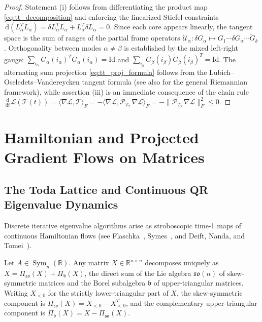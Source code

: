 \documentclass[11pt,a4paper,reqno]{amsart}
\theoremstyle{definition}
\numberwithin{equation}{section}
\providecommand{\R}{\mathbb{R}}
\newcommand{\Id}{\mathrm{Id}}
\newcommand{\dif}{\,\mathrm{d}}
\providecommand{\R}{\mathbb{R}}
\begin{document}
\begin{proof}
Statement (i) follows from differentiating the product map \eqref{eq:tt_decomposition} and enforcing the linearized Stiefel constraints $\dif(L_\alpha^T L_\alpha) = \delta L_\alpha^T L_\alpha + L_\alpha^T \delta L_\alpha = 0$. Since each core appears linearly, the tangent space is the sum of ranges of the partial frame operators $\mathcal{U}_\alpha \colon \delta G_\alpha \mapsto G_1 \cdots \delta G_\alpha \cdots \widetilde{G}_k$. Orthogonality between modes $\alpha \neq \beta$ is established by the mixed left-right gauge: $\sum_{i_\alpha} G_\alpha(i_\alpha)^T G_\alpha(i_\alpha) = \Id$ and $\sum_{i_\beta} \widetilde{G}_\beta(i_\beta) \widetilde{G}_\beta(i_\beta)^T = \Id$. The alternating sum projection \eqref{eq:tt_proj_formula} follows from the Lubich--Oseledets--Vandereycken tangent formula \cite{lubich2015tt} (see also \cite{absil2009optimization} for the general Riemannian framework), while assertion (iii) is an immediate consequence of the chain rule $\frac{\dif}{\dif t}\mathcal{L}(\mathcal{T}(t)) = \langle \nabla \mathcal{L}, \dot{\mathcal{T}} \rangle_F = -\langle \nabla \mathcal{L}, \mathcal{P}_{T_{\mathcal{T}}} \nabla \mathcal{L} \rangle_F = -\|\mathcal{P}_{T_{\mathcal{T}}} \nabla \mathcal{L}\|_F^2 \le 0$.
\end{proof}

\section{Hamiltonian and Projected Gradient Flows on Matrices}
\label{sec:gradient_flows}

\subsection{The Toda Lattice and Continuous QR Eigenvalue Dynamics}
Discrete iterative eigenvalue algorithms arise as stroboscopic time-1 maps of continuous Hamiltonian flows (see Flaschka~\cite{flaschka1974toda}, Symes~\cite{symes1982qr}, and Deift, Nanda, and Tomei~\cite{deift1983ode}).

Let $A \in \operatorname{Sym}_n(\R)$. Any matrix $X \in \R^{n \times n}$ decomposes uniquely as $X = \Pi_{\mathfrak{so}}(X) + \Pi_{\mathfrak{b}}(X)$, the direct sum of the Lie algebra $\mathfrak{so}(n)$ of skew-symmetric matrices and the Borel subalgebra $\mathfrak{b}$ of upper-triangular matrices. Writing $X_{<0}$ for the strictly lower-triangular part of $X$, the skew-symmetric component is $\Pi_{\mathfrak{so}}(X) = X_{<0} - X_{<0}^T$, and the complementary upper-triangular component is $\Pi_{\mathfrak{b}}(X) = X - \Pi_{\mathfrak{so}}(X)$.
\end{document}
